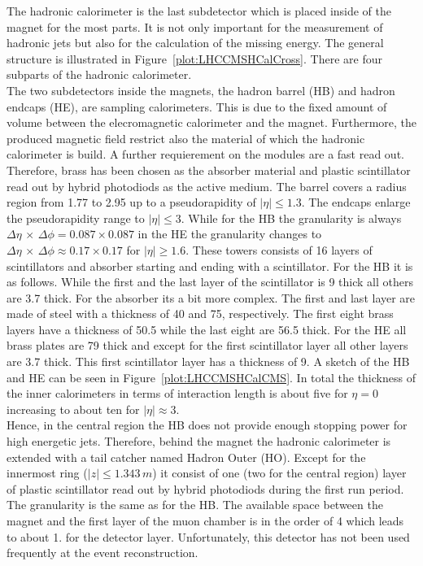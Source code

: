 The hadronic calorimeter is the last subdetector which is placed inside of the magnet for the most parts. It is not only important for the measurement of hadronic jets but also for the calculation of the missing energy. The general structure is illustrated in Figure~\ref{plot:LHCCMSHCalCross}. There are four subparts of the hadronic calorimeter.\\
The two subdetectors inside the magnets, the hadron barrel (HB) and hadron endcaps (HE), are sampling calorimeters. This is due to the fixed amount of volume between the elecromagnetic calorimeter and the magnet. Furthermore, the produced magnetic field restrict also the material of which the hadronic calorimeter is build. A further requierement on the modules are a fast read out. Therefore, brass has been chosen as the absorber material and plastic scintillator read out by hybrid photodiods as the active medium. The barrel covers a radius region from 1.77 to 2.95\m{} up to a pseudorapidity of $\left|\eta{}\right| \leq{} 1.3$. The endcaps enlarge the pseudorapidity range to $\left|\eta{}\right| \leq{} 3$. While for the HB the granularity is always $\Delta{}\eta\,\times\,\Delta{}\phi{} = 0.087 \times{} 0.087$ in the HE the granularity changes to $\Delta{}\eta\,\times\,\Delta{}\phi{} \approx 0.17 \times{} 0.17$ for $\left|\eta{}\right| \geq{} 1.6$. These towers consists of 16 layers of scintillators and absorber starting and ending with a scintillator. For the HB it is as follows. While the first and the last layer of the scintillator is 9\mm{} thick all others are 3.7\mm{} thick. For the absorber its a bit more complex. The first and last layer are made of steel with a thickness of 40\mm{} and 75\mm{}, respectively. The first eight brass layers have a thickness of 50.5\mm{} while the last eight are 56.5\mm{} thick. For the HE all brass plates are 79\mm{} thick and except for the first scintillator layer all other layers are 3.7\mm{} thick. This first scintillator layer has a thickness of 9\mm{}. A sketch of the HB and HE can be seen in Figure~\ref{plot:LHCCMSHCalCMS}. In total the thickness of the inner calorimeters in terms of interaction length is about five for $\eta{}=0$ increasing to about ten for $\left|\eta{}\right|\approx{}3$.\\
Hence, in the central region the HB does not provide enough stopping power for high energetic jets. Therefore, behind the magnet the hadronic calorimeter is extended with a tail catcher named Hadron Outer (HO). Except for the innermost ring ($\left|z\right| \leq{} 1.343\,m$) it consist of one (two for the central region) layer of plastic scintillator read out by hybrid photodiods during the first run period. The granularity is the same as for the HB. The available space between the magnet and the first layer of the muon chamber is in the order of 4\cm{} which leads to about 1.\cm{} for the detector layer. Unfortunately, this detector has not been used frequently at the event reconstruction.
